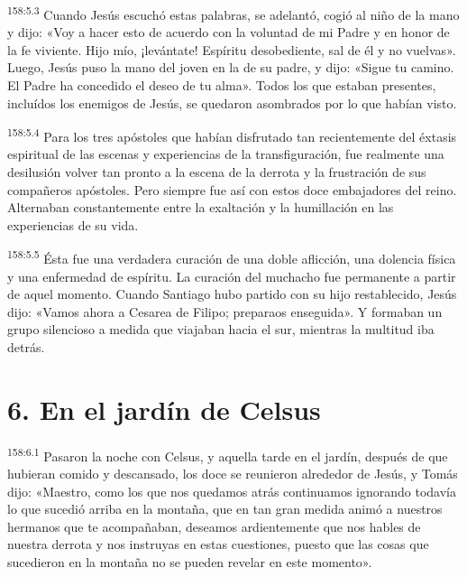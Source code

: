 \par 
\textsuperscript{158:5.3} Cuando Jesús escuchó estas palabras, se adelantó, cogió al niño de la mano y dijo: «Voy a hacer esto de acuerdo con la voluntad de mi Padre y en honor de la fe viviente. Hijo mío, ¡levántate! Espíritu desobediente, sal de él y no vuelvas». Luego, Jesús puso la mano del joven en la de su padre, y dijo: «Sigue tu camino. El Padre ha concedido el deseo de tu alma». Todos los que estaban presentes, incluídos los enemigos de Jesús, se quedaron asombrados por lo que habían visto.

\par 
\textsuperscript{158:5.4} Para los tres apóstoles que habían disfrutado tan recientemente del éxtasis espiritual de las escenas y experiencias de la transfiguración, fue realmente una desilusión volver tan pronto a la escena de la derrota y la frustración de sus compañeros apóstoles. Pero siempre fue así con estos doce embajadores del reino. Alternaban constantemente entre la exaltación y la humillación en las experiencias de su vida.

\par 
\textsuperscript{158:5.5} Ésta fue una verdadera curación de una doble aflicción, una dolencia física y una enfermedad de espíritu. La curación del muchacho fue permanente a partir de aquel momento. Cuando Santiago hubo partido con su hijo restablecido, Jesús dijo: «Vamos ahora a Cesarea de Filipo; preparaos enseguida». Y formaban un grupo silencioso a medida que viajaban hacia el sur, mientras la multitud iba detrás.

\section*{6. En el jardín de Celsus}
\par 
\textsuperscript{158:6.1} Pasaron la noche con Celsus, y aquella tarde en el jardín, después de que hubieran comido y descansado, los doce se reunieron alrededor de Jesús, y Tomás dijo: «Maestro, como los que nos quedamos atrás continuamos ignorando todavía lo que sucedió arriba en la montaña, que en tan gran medida animó a nuestros hermanos que te acompañaban, deseamos ardientemente que nos hables de nuestra derrota y nos instruyas en estas cuestiones, puesto que las cosas que sucedieron en la montaña no se pueden revelar en este momento».

